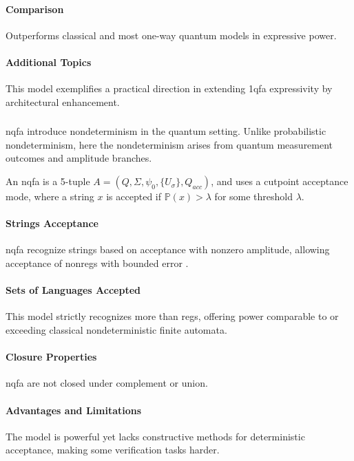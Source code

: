 \paragraph{Comparison}
Outperforms classical and most one-way quantum models in expressive power.

\paragraph{Additional Topics}
This model exemplifies a practical direction in extending \gls{1qfa} expressivity by architectural enhancement.

\subsubsection{}
\gls{nqfa} introduce nondeterminism in the quantum setting. Unlike probabilistic nondeterminism, here the nondeterminism arises from quantum measurement outcomes and amplitude branches.

\begin{definition}
An \gls{nqfa} is a 5-tuple \( A = (Q, \Sigma, \psi_0, \{U_\sigma\}, Q_{acc}) \), and uses a cutpoint acceptance mode, where a string \( x \) is accepted if \( \mathbb{P}(x) > \lambda \) for some threshold \( \lambda \).
\end{definition}

\paragraph{Strings Acceptance}
\gls{nqfa} recognize strings based on acceptance with nonzero amplitude, allowing acceptance of non\glspl{reg} with bounded error \cite{yakaryilmaz2009languages}.

\paragraph{Sets of Languages Accepted}
This model strictly recognizes more than \glspl{reg}, offering power comparable to or exceeding classical nondeterministic finite automata.

\paragraph{Closure Properties}
\gls{nqfa} are not closed under complement or union.

\paragraph{Advantages and Limitations}
The model is powerful yet lacks constructive methods for deterministic acceptance, making some verification tasks harder.

